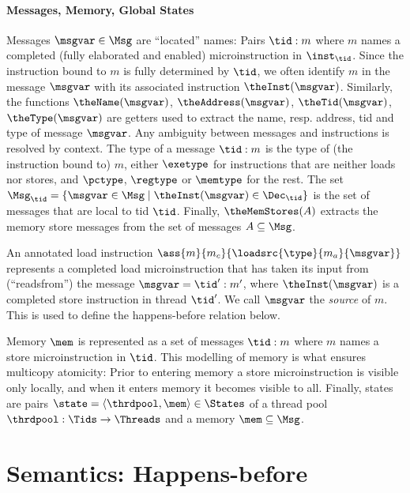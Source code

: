 

\paragraph{Messages, Memory, Global States}
%
Messages $\msgvar\in\Msg$ are ``located'' names: Pairs $\tid:m$ where $m$ names a completed (fully elaborated and enabled) microinstruction in $\inst_\tid$. Since the instruction bound to $m$ is fully determined by $\tid$, we often identify $m$ in the message $\msgvar$ with its associated instruction $\theInst(\msgvar)$. Similarly, the functions $\theName(\msgvar)$, $\theAddress(\msgvar)$, $\theTid(\msgvar)$, $\theType(\msgvar)$ are getters used to extract the name, resp. address, tid and type of message $\msgvar$. Any ambiguity between messages and instructions is resolved by context. The type of a message $\tid:m$ is the type of (the instruction bound to) $m$, either $\exetype$ for instructions that are neither loads nor stores, and $\pctype$, $\regtype$ or $\memtype$ for the rest. 
The set $\Msg_\tid=\{\msgvar\in\Msg \mid \theInst(\msgvar) \in \Dec_\tid\}$ 
is the set of messages that are local to tid $\tid$. Finally, $\theMemStores(A)$ extracts the memory store messages from the set of messages $A\subseteq\Msg$.

An annotated load instruction $\ass{m}{m_c}{\loadsrc{\type}{m_a}{\msgvar}}$ represents a completed load microinstruction that has taken its input
from (``readsfrom'') the message $\msgvar = \tid':m'$, where $\theInst(\msgvar)$ is a completed store instruction in thread $\tid'$. We call $\msgvar$ the \emph{source} of $m$. This is used to define the happens-before relation below.

Memory $\mem$ is represented as a set of messages $\tid:m$ where $m$ names a
store microinstruction in $\tid$. This modelling of memory is what ensures multicopy atomicity: Prior to entering memory a store microinstruction is visible only locally, and when it enters memory it becomes visible to all.
Finally, states are pairs $\state = \langle \thrdpool,\mem \rangle\in\States$ of a thread pool $\thrdpool : \Tids\rightarrow \Threads$ and a memory $\mem\subseteq\Msg$.

\section{Semantics: Happens-before}

